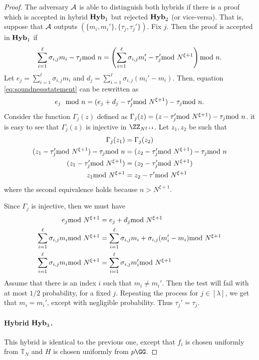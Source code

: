 \begin{proof}
The adversary $\mathcal{A}$ is able to distinguish both hybrids if there is a proof which is accepted in hybrid $\mathsf{\mathbf{Hyb}}_1$ but rejected $\mathsf{\mathbf{Hyb}}_2$ (or vice-versa). 
That is, suppose that $\mathcal{A}$ outputs $(\{m_i,m_i'\}, \{\tau_j,\tau_{j}'\})$. Fix $j$. Then the proof is accepted in $\mathsf{\mathbf{Hyb}}_1$ if 
\begin{equation}
    \label{eq:soundnessstatement}
    \sum_{i=1}^\ell \sigma_{i,j} m_i - \tau_j \smod n=\left( \sum_{i=1}^\ell \sigma_{i,j}m_i' -\tau'_j \smod N^{\xi+1} \right)\smod n.
\end{equation}
Let $e_j=\sum_{i=1}^\ell\sigma_{i,j}m_i$ and $d_j=\sum_{i=1}^\ell \sigma_{i,j}(m_i'-m_i)$. 
Then, equation \ref{eq:soundnessstatement} can be rewritten as $$e_j\mod n= (e_j+d_j-\tau'_j\smod N^{\xi+1})-\tau_j \smod n.$$
 Consider the function $\Gamma_j(z)$ defined as $\Gamma_j(z)=(z-\tau'_j\smod N^{\xi+1})-\tau_j \smod n$. it is easy to see that $\Gamma_j(z)$ is injective in $\ZZ_{N^{\xi+1}}$. Let $z_1,z_2$ be such that \begin{align*}
      \Gamma_j(z_1)&=\Gamma_j(z_2)\\
      (z_1-\tau'_j\smod N^{\xi+1})-\tau_j \smod n&= (z_2-\tau'_j\smod N^{\xi+1})-\tau_j \smod n \\ 
      (z_1-\tau'_j\smod N^{\xi+1})&= (z_2-\tau'_j\smod N^{\xi+1}) \\ 
      z_1\smod N^{\xi+1}&= z_2-\tau'\smod N^{\xi+1}
 \end{align*} where the second equivalence holds because $n>N^{\xi+1}$. 
 
 Since $\Gamma_j$ is injective, then we must have \begin{align*}
      e_j\smod N^{\xi+1}&=e_j+d_j\smod N^{\xi+1}\\
      \sum_{i=1}^\ell\sigma_{i,j}m_i \smod N^{\xi+1}&= \sum_{i=1}^\ell \sigma_{i,j}m_i +\sigma_{i,j}(m_i'-m_i) \smod  N^{\xi+1} \\ \sum_{i=1}^\ell\sigma_{i,j}m_i \smod N^{\xi+1}&= \sum_{i=1}^\ell \sigma_{i,j}m_i' \smod  N^{\xi+1} \\
 \end{align*} 
 Assume that there is an index $i$ such that $m_i\neq m_i'$. Then the test will fail with at most $1/2$ probability, for a fixed $j$.
 Repeating the process for $j\in [\lambda]$, we get that $m_i=m_i'$, except with negligible probability. Thus $\tau_{j}'=\tau_j$.
\paragraph{Hybrid $\mathsf{\mathbf{Hyb}}_3$.} This hybrid is identical to the previous one, except that $f_i$ is chosen uniformly from $\mathbb{T}_N$ and $H$ is chosen uniformly from $p\GG$. 


\end{proof}
